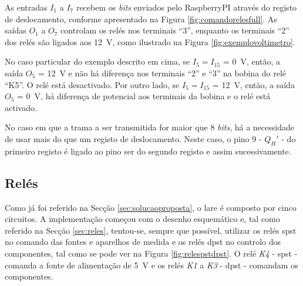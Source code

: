 As entradas $I_{1}$ a $I_{7}$ recebem os \textit{bits} enviados pelo \gls{RaspberryPI} através do registo de deslocamento, conforme apresentado na Figura \ref{fig:comandorelesfull}. As saídas $O_{1}$ a $O_{7}$ controlam os relés nos terminais ``3'', enquanto os terminais ``2'' dos relés são ligados aos \SI{12}{\volt}, como ilustrado na Figura \ref{fig:exemplovoltimetro}.


No caso particular do exemplo descrito em cima, se $I_{5} = I_{15}$ = \SI{0}{\volt}, então, a saída $O_{5}$ = \SI{12}{\volt} e não há diferença nos terminais ``2'' e ``3'' na bobina do relé  ``K5''. O relé está desactivado. Por outro lado, se $I_{5} = I_{15}$ = \SI{12}{\volt}, então, a saída $O_{5}$ = \SI{0}{\volt}, há diferença de potencial aos terminais da bobina e o relé está activado.

No caso em que a trama a ser transmitida for maior que 8 \textit{bits}, há a necessidade de usar mais do que um registo de deslocamento. Neste caso, o pino 9 - $Q_{H}'$ - do primeiro registo é ligado ao pino \acrshort{ser} do segundo registo e assim sucessivamente.

\subsection{Relés}
\label{sec:hwreles}
Como já foi referido na Secção \ref{sec:solucaoproposta}, o \acrshort{lare} é composto por cinco circuitos. A implementação começou com o desenho esquemático e, tal como referido na Secção \ref{sec:reles}, tentou-se, sempre que possível, utilizar os relés \acrshort{spst} no comando das fontes e aparelhos de medida e os relés \acrshort{dpst} no controlo dos componentes, tal como se pode ver na Figura \ref{fig:relespstdpst}. O relé \textit{K4} - \acrshort{spst} - comanda a fonte de alimentação de \SI{5}{\volt} e os relés \textit{K1} a \textit{K3} - \acrshort{dpst} - comandam os componentes.

